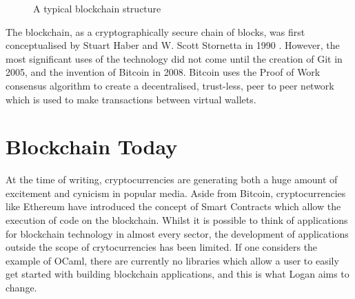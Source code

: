 \documentclass[12pt,a4paper,twoside,openright]{report}
\begin{document}
	\begin{figure}
		\begin{center}
			\end{center}
		\caption{A typical blockchain structure}
		\label{fig:mainblockchain}
	\end{figure}
	The blockchain, as a cryptographically secure chain of blocks, was first conceptualised by Stuart Haber and W. Scott Stornetta in 1990 \parencite{10.1007/3-540-38424-3_32}.
	However, the most significant uses of the technology did not come until the creation of Git \parencite{Git} in 2005, and the invention of Bitcoin \parencite{Bitcoin} in 2008.
	Bitcoin uses the Proof of Work consensus algorithm to create a decentralised, trust-less, peer to peer network which is used to make transactions between virtual wallets.

	\section{Blockchain Today}
	At the time of writing, cryptocurrencies are generating both a huge amount of excitement and cynicism in popular media. 
	Aside from Bitcoin, cryptocurrencies like Ethereum \parencite{Ethereum} have introduced the concept of Smart Contracts which allow the execution of code on the blockchain.
	Whilst it is possible to think of applications for blockchain technology in almost every sector, the development of applications outside the scope of crytocurrencies has been limited. 
	If one considers the example of OCaml, there are currently no libraries which allow a user to easily get started with building blockchain applications, and this is what Logan aims to change. \\
\end{document}
